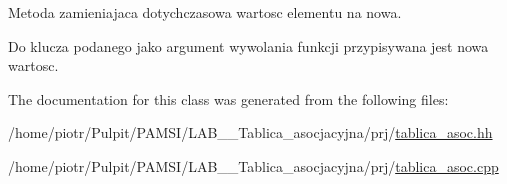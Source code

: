 \-Metoda zamieniajaca dotychczasowa wartosc elementu na nowa. 

\-Do klucza podanego jako argument wywolania funkcji przypisywana jest nowa wartosc. 

\-The documentation for this class was generated from the following files\-:\begin{DoxyCompactItemize}
\item 
/home/piotr/\-Pulpit/\-P\-A\-M\-S\-I/\-L\-A\-B\-\_\-\_\-\-Tablica\-\_\-asocjacyjna/prj/\hyperlink{tablica__asoc_8hh}{tablica\-\_\-asoc.\-hh}\item 
/home/piotr/\-Pulpit/\-P\-A\-M\-S\-I/\-L\-A\-B\-\_\-\_\-\-Tablica\-\_\-asocjacyjna/prj/\hyperlink{tablica__asoc_8cpp}{tablica\-\_\-asoc.\-cpp}\end{DoxyCompactItemize}
